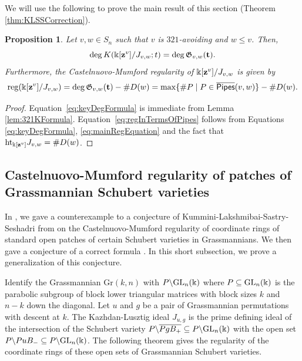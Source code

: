 \documentclass[12pt]{amsart}
\newtheorem{proposition}[theorem]{Proposition}
\theoremstyle{definition}
\theoremstyle{remark}
\numberwithin{equation}{section}
\newcommand{\KPipes}{\overline{\sf Pipes}}
\newcommand{\GL}{{\rm GL}}
\newcommand{\reg}{{\rm reg}}
\begin{document}
We will use the following to prove the main result of this section (Theorem \ref{thm:KLSSCorrection}).  

\begin{proposition}
\label{prop:pipeKLreg}
Let $v,w\in S_n$ such that $v$ is $321$-avoiding and $w\leq v$.  Then,
\begin{equation}\label{eq:keyDegFormula}
   \deg K(\Bbbk[{\bf z}^v]/J_{v,w};t) = \deg \mathfrak{G}_{v,w}(\bf{t}).
\end{equation}
Furthermore, the Castelnuovo-Mumford regularity of $\Bbbk[{\bf z}^v]/J_{v,w}$ is given by
\begin{equation}\label{eq:regInTermsOfPipes}
    \reg (\Bbbk[{\bf z}^v]/J_{v,w}) = \deg \mathfrak{G}_{v,w}({\bf{t}})-\#D(w) =  \max\{\#P\mid P\in \KPipes(v,w)\}-\#D(w).
\end{equation}
\end{proposition}
\begin{proof}
Equation~\eqref{eq:keyDegFormula} is immediate from Lemma \ref{lem:321KFormula}. Equation~\eqref{eq:regInTermsOfPipes} follows from Equations \eqref{eq:keyDegFormula}, \eqref{eq:mainRegEquation} and the fact that $\text{ht}_{\Bbbk[{\bf z}^v]}J_{v,w} = \#D(w)$.
\end{proof}



\subsection{Castelnuovo-Mumford regularity of patches of Grassmannian Schubert varieties}\label{sec:regGrassPatches}
In \cite{RRRSW}, we gave a counterexample to a conjecture of Kummini-Lakshmibai-Sastry-Seshadri from \cite{KLSS} on the Castelnuovo-Mumford regularity of coordinate rings of standard open patches of certain Schubert varieties in Grassmannians. We then gave a conjecture of a correct formula \cite[Conjecture 5.6]{RRRSW}. In this short subsection, we prove a generalization of this conjecture. 

Identify the Grassmannian $\text{Gr}(k,n)$ with $P\backslash \GL_n(\Bbbk)$ where $P\subseteq \GL_n(\Bbbk)$ is the parabolic subgroup of block lower triangular matrices with block sizes $k$ and $n-k$ down the diagonal. Let $u$ and $g$ be a pair of Grassmannian permutations with descent at $k$. The Kazhdan-Lusztig ideal $J_{u,g}$ is the prime defining ideal of the intersection of the Schubert variety $P\backslash \overline{P g B_+}\subseteq P\backslash \GL_n(\Bbbk)$ with the open set $P\backslash P u B_-\subseteq P\backslash \GL_n(\Bbbk)$. The following theorem gives the regularity of the coordinate rings of these open sets of Grassmannian Schubert varieties. 
\end{document}
